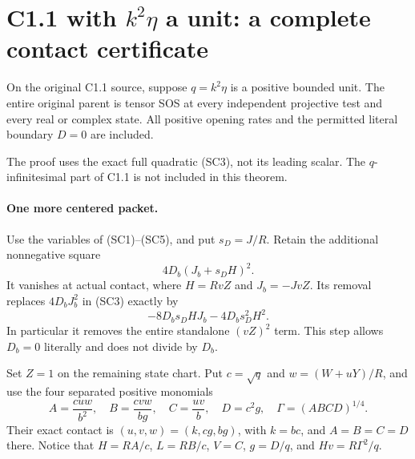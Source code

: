 \section{C1.1 with $k^2\eta$ a unit: a complete contact certificate}
\label{sec:r7-c1-q-unit}
\begin{theorem}
On the original C1.1 source, suppose $q=k^2\eta$ is a positive bounded
unit. The entire original parent is tensor SOS at every independent
projective test and every real or complex state. All positive opening
rates and the permitted literal boundary $D=0$ are included.
\end{theorem}
The proof uses the exact full quadratic (SC3), not its leading scalar.
The $q$-infinitesimal part of C1.1 is not included in this theorem.

\paragraph{One more centered packet.}
Use the variables of (SC1)--(SC5), and put $s_D=J/R$. Retain the
additional nonnegative square
\[
                  4D_b(J_b+s_DH)^2.                 \tag{SC10}
\]
It vanishes at actual contact, where $H=RvZ$ and $J_b=-JvZ$.
Its removal replaces $4D_bJ_b^2$ in (SC3) exactly by
\[
                  -8D_bs_DHJ_b-4D_bs_D^2H^2.
\]
In particular it removes the entire standalone $(vZ)^2$ term.
This step allows $D_b=0$ literally and does not divide by $D_b$.

Set $Z=1$ on the remaining state chart. Put $c=\sqrt q$ and
$w=(W+uY)/R$, and use the four separated positive monomials
\[
 A=\frac{cuw}{b^2},\quad B=\frac{cvw}{bg},\quad
 C=\frac{uv}{b},\quad D=c^2g,\quad
 \Gamma=(ABCD)^{1/4}.
 \tag{SC11}
\]
Their exact contact is $(u,v,w)=(k,cg,bg)$, with $k=bc$, and
$A=B=C=D$ there. Notice that $H=RA/c$, $L=RB/c$, $V=C$,
$g=D/q$, and $Hv=R\Gamma^2/q$.

